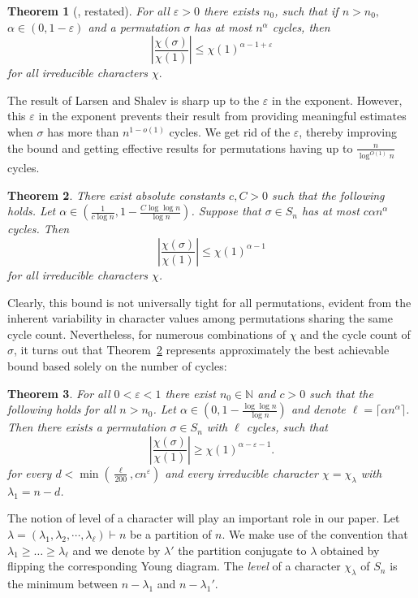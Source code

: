 \documentclass[11pt, letterpaper]{amsart}
\newtheorem{thm}{Theorem}[section]
\newcommand\eps{\varepsilon}
\renewcommand\ge{\geqslant}
\renewcommand\le{\leqslant}
\renewcommand{\epsilon}{\eps}
\newcommand{\NN}{\mathbb{N}}
\begin{document}
\begin{thm}[{\cite[Theorem 1.4]{larsen2008characters}}, restated]
For all $\epsilon>0$ there exists $n_0$, such that if $n>n_0,$ $\alpha\in (0,1-\epsilon)$ and a permutation $\sigma$ has at most   
$n^{\alpha}$ cycles, then 
\[ \left|\frac{\chi(\sigma)}{\chi(1)} \right|\le \chi(1)^{\alpha -1+\epsilon}\] 
for all irreducible characters $\chi.$
\end{thm}

The result of Larsen and Shalev is sharp up to the $\epsilon$ in the exponent. However, this $\epsilon$ in the exponent prevents their result from providing meaningful estimates when $\sigma$ has more than $n^{1-o(1)}$ cycles. We get rid of the $\epsilon$, thereby improving the bound and getting effective results for permutations having up to $\frac{n}{\log^{O(1)} n}$ cycles. 

\begin{thm}\label{thm: few cycles}
There exist absolute constants $c,C>0$ such that the following holds. Let $\alpha \in(\frac{1}{c\log n},1-\frac{C\log\log n}{\log n})$. Suppose that $\sigma\in S_n$ has at most $c\alpha n^{\alpha}$ cycles. Then 
\[
\left|\frac{\chi(\sigma)}{\chi(1)}\right|\le \chi(1)^{\alpha -1}
\]
for all irreducible characters $\chi$.
\end{thm}

Clearly, this bound is not universally tight for all permutations, evident from the inherent variability in character values among permutations sharing the same cycle count. Nevertheless, for numerous combinations of $\chi$ and the cycle count of $\sigma$, it turns out that Theorem~\ref{thm: few cycles} represents approximately the best achievable bound based solely on the number of cycles:
\begin{thm}\label{thm: lower bound few cycles}
    For all $0 < \epsilon < 1$ there exist $n_0 \in \NN$ and $c > 0$ such that the following holds for all $n > n_0$. Let $\alpha\in(0,1-\frac{\log\log n}{\log n})$ and denote $\ell=\lceil\alpha n^{\alpha}\rceil$. Then there exists a permutation $\sigma \in S_n$ with $\ell$ cycles, such that
\[
\left|\frac{\chi(\sigma)}{\chi(1)}\right|\ge\chi(1)^{\alpha-\epsilon-1}.
\]
for every $d < \min(\frac{\ell}{200},cn^\epsilon)$ and every irreducible character $\chi = \chi_\lambda$ with $\lambda_1=n-d$.
\end{thm}

The notion of level of a character will play an important role in our paper. Let $\lambda=(\lambda_1, \lambda_2, \cdots, \lambda_\ell) \vdash n$ be a partition of $n$. We make use of the convention that $\lambda_1\ge \ldots \ge \lambda_{\ell}$ and we denote by $\lambda'$ the partition conjugate to $\lambda$ obtained by flipping the corresponding Young diagram. The \emph{level} of a character $\chi_{\lambda}$ of $S_n$ is the minimum between $n-\lambda_1$ and $n-\lambda_1'$.
\end{document}
